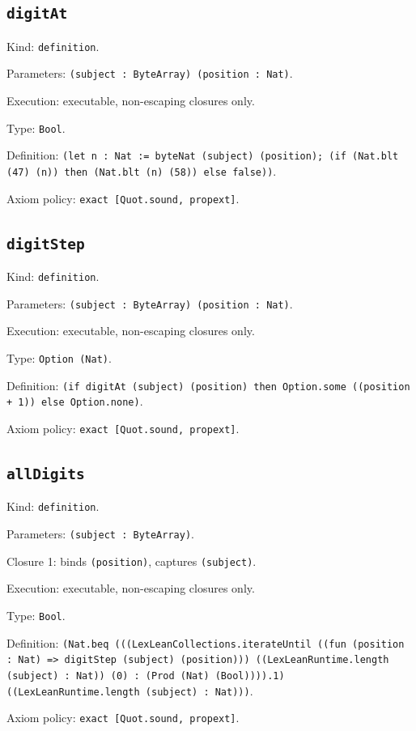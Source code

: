 \documentclass[11pt]{article}
\begin{document}
\subsection*{\texttt{digitAt}}
\noindent Kind: \texttt{definition}.\par
\noindent Parameters: \texttt{(subject : ByteArray) (position : Nat)}.\par
\noindent Execution: executable, non-escaping closures only.\par
\noindent Type: \texttt{Bool}.\par
\noindent Definition: \texttt{(let n : Nat := byteNat (subject) (position); (if (Nat.blt (47) (n)) then (Nat.blt (n) (58)) else false))}.\par
\noindent Axiom policy: \texttt{exact [Quot.sound, propext]}.\par
\subsection*{\texttt{digitStep}}
\noindent Kind: \texttt{definition}.\par
\noindent Parameters: \texttt{(subject : ByteArray) (position : Nat)}.\par
\noindent Execution: executable, non-escaping closures only.\par
\noindent Type: \texttt{Option (Nat)}.\par
\noindent Definition: \texttt{(if digitAt (subject) (position) then Option.some ((position + 1)) else Option.none)}.\par
\noindent Axiom policy: \texttt{exact [Quot.sound, propext]}.\par
\subsection*{\texttt{allDigits}}
\noindent Kind: \texttt{definition}.\par
\noindent Parameters: \texttt{(subject : ByteArray)}.\par
\noindent Closure 1: binds \texttt{(position)}, captures \texttt{(subject)}.\par
\noindent Execution: executable, non-escaping closures only.\par
\noindent Type: \texttt{Bool}.\par
\noindent Definition: \texttt{(Nat.beq (((LexLeanCollections.iterateUntil ((fun (position : Nat) => digitStep (subject) (position))) ((LexLeanRuntime.length (subject) : Nat)) (0) : (Prod (Nat) (Bool)))).1) ((LexLeanRuntime.length (subject) : Nat)))}.\par
\noindent Axiom policy: \texttt{exact [Quot.sound, propext]}.\par
\end{document}
